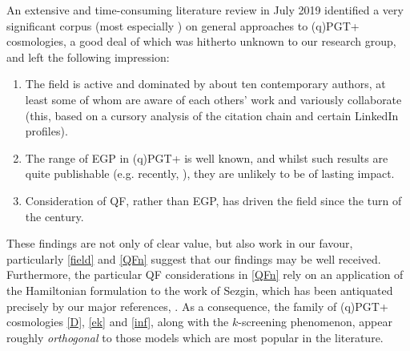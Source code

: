 \documentclass[twoside]{report}
\begin{document}
\begin{multicols}{2}
An extensive and time-consuming literature review in July 2019 identified a very significant corpus (most especially \cite{1980PhLA...80..232M,1984CQGra...1..651G,2000CQGra..17.3045M,2003gr.qc....10060M,2007AcPPB..38...61M,2006CQGra..23.4237M,2007CQGra..24.5835M,2009PhLB..678..423M,2011arXiv1107.1566G,2013JCAP...03..040M,2005NewAR..49...59P,2008PhRvD..78b3522S,2009JCAP...10..027C}) on general approaches to (q)PGT+ cosmologies, a good deal of which was hitherto unknown to our research group, and left the following impression:
\begin{enumerate}[resume]
  \item\label{field} The field is active and dominated by about ten contemporary authors, at least some of whom are aware of each others' work and variously collaborate (this, based on a cursory analysis of the citation chain and certain LinkedIn profiles).
  \item\label{boring} The range of EGP in (q)PGT+ is well known, and whilst such results are quite publishable (e.g. recently, \cite{2019arXiv190604340Z}), they are unlikely to be of lasting impact.
  \item\label{QFn} Consideration of QF, rather than EGP, has driven the field since the turn of the century.
\end{enumerate}
These findings are not only of clear value, but also work in our favour, particularly \ref{field} and \ref{QFn} suggest that our findings may be well received. Furthermore, the particular QF considerations in \ref{QFn} rely \cite{2011PhRvD..83b4001B} on an application of the Hamiltonian formulation to the work of Sezgin, which has been antiquated precisely by our major references, \cite{2019PhRvD..99f4001L,Lin2}. As a consequence, the family of (q)PGT+ cosmologies \ref{D}, \ref{ek} and \ref{inf}, along with the $k$-screening phenomenon, appear roughly \textit{orthogonal} to those models which are most popular in the literature.


\end{multicols}
\end{document}
